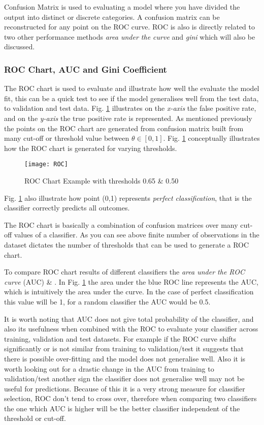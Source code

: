 Confusion Matrix is used to evaluating a model where you have divided the output into distinct or discrete categories. A confusion matrix can be reconstructed for any point on the ROC curve. ROC is also is directly related to two other performance methods \textit{area under the curve} and \textit{gini} which will also be discussed.  

\subsubsection{ROC Chart, AUC and Gini Coefficient}
The ROC chart is used to evaluate and illustrate how well the evaluate the model fit, this can be a quick test to see if the model generalises well from the test data, to validation and test data. Fig. \ref{fig:ROC} illustrates on the \textit{x-axis} the false positive rate, and on the \textit{y-axis} the true positive rate is represented. As mentioned previously the points on the ROC chart are generated from confusion matrix built from many cut-off or threshold value between $\theta \in [0,1]$. Fig. \ref{fig:ROC} conceptually illustrates how the ROC chart is generated for varying thresholds. 

\begin{figure}[H]
	\texttt{[image: ROC]}
	\caption[ROC]
	{ROC Chart Example with thresholds 0.65 \& 0.50}
	\label{fig:ROC}
\end{figure}

Fig. \ref{fig:ROC} also illustrate how point (0,1) represents \textit{perfect classification}, that is the classifier correctly predicts all outcomes. 

The ROC chart is basically a combination of confusion matrices over many cut-off values of a classifier. As you can see above finite number of observations in the dataset dictates the number of thresholds that can be used to generate a ROC chart.

To compare ROC chart results of different classifiers the \textit{area under the ROC curve} (AUC) \citep{bradley_use_1997} \& \citep{hanley_meaning_1982}. In Fig. \ref{fig:ROC} the area under the blue ROC line represents the AUC, which is intuitively the area under the curve. In the case of perfect classification this value will be 1, for a random classifier the AUC would be 0.5. 

It is worth noting that AUC does not give total probability of the classifier, and also its usefulness when combined with the ROC to evaluate your classifier across training, validation and test datasets. For example if the ROC curve shifts significantly or is not similar from training to validation/test it suggests that there is possible over-fitting and the model does not generalise well. Also it is worth looking out for a drastic change in the AUC from training to validation/test another sign the classifier does not generalise well may not be useful for predictions. Because of this it is a very strong measure for classifier selection, ROC don't tend to cross over, therefore when comparing two classifiers the one which AUC is higher will be the better classifier independent of the threshold or cut-off.

